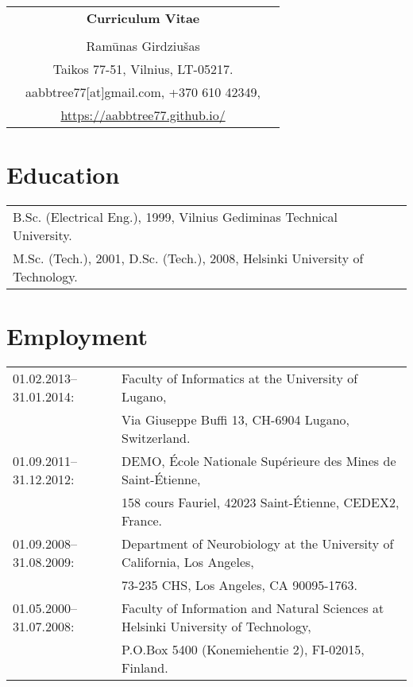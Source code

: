 \documentclass[a4paper,11pt]{article}
\begin{document}

%
%
\begin{center}
\begin{tabular}{ccc}
&\Large \textbf{Curriculum Vitae}&\\
\\
& Ram\={u}nas Girdziu\v{s}as &\\  
& Taikos 77-51, Vilnius, LT-05217. &\\
& aabbtree77[at]gmail.com, +370 610 42349, &\\
& \url{https://aabbtree77.github.io/}
\end{tabular}
\end{center}
%
\section{Education}
%
\begin{tabular}{ll}
        B.Sc. (Electrical Eng.), 1999, Vilnius Gediminas Technical University.\\
        M.Sc. (Tech.), 2001, D.Sc. (Tech.), 2008, Helsinki University of Technology.
\end{tabular}
%
\section{Employment}
%
\begin{tabular}{ll}
01.02.2013--31.01.2014: & Faculty of Informatics at the University of Lugano,\\
                        & Via Giuseppe Buffi 13, CH-6904 Lugano, Switzerland. 
\\
01.09.2011--31.12.2012: & DEMO, \'{E}cole Nationale Sup\'{e}rieure des Mines de Saint-\'{E}tienne,\\
&158 cours Fauriel, 42023 Saint-\'Etienne, CEDEX2, France.
\\
01.09.2008--31.08.2009: & Department of Neurobiology at the University of California, Los Angeles,\\
&73-235 CHS, Los Angeles, CA 90095-1763.
\\
01.05.2000--31.07.2008: & Faculty of Information and Natural Sciences at Helsinki University of Technology,\\ 
&  P.O.Box 5400 (Konemiehentie 2), FI-02015, Finland.
\end{tabular}
\end{document}
